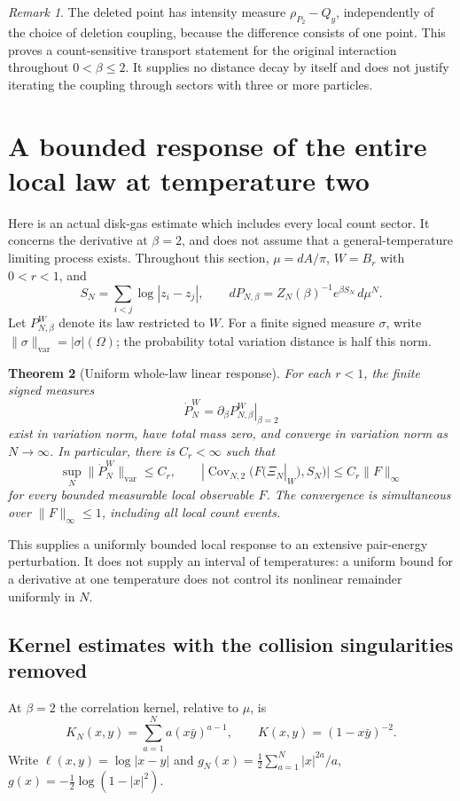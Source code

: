 \documentclass[11pt]{article}
\newtheorem{theorem}{Theorem}[section]
\theoremstyle{remark}\newtheorem{remark}[theorem]{Remark}
\begin{document}
\begin{remark}
The deleted point has intensity measure $\rho_{P_2}-Q_y$, independently
of the choice of deletion coupling, because the difference consists
of one point.  This proves a count-sensitive transport statement for
the original interaction throughout $0<\beta\le2$.  It supplies no
distance decay by itself and does not justify iterating the coupling
through sectors with three or more particles.
\end{remark}


\section{A bounded response of the entire local law at temperature two}
\label{sec:whole-local-linear-response}

Here is an actual disk-gas estimate which includes every local count sector.
It concerns the derivative at $\beta=2$, and does not assume that a
general-temperature limiting process exists. Throughout this section,
$\mu=dA/\pi$, $W=B_r$ with $0<r<1$, and
\[
 S_N=\sum_{i<j}\log|z_i-z_j|,
 \qquad dP_{N,\beta}=Z_N(\beta)^{-1}e^{\beta S_N}\,d\mu^N.
\]
Let $P_{N,\beta}^W$ denote its law restricted to $W$. For a finite signed
measure $\sigma$, write $\|\sigma\|_{\mathrm{var}}=|\sigma|(\Omega)$;
the probability total variation distance is half this norm.

\begin{theorem}[Uniform whole-law linear response]
\label{thm:whole-law-linear-response}
For each $r<1$, the finite signed measures
\[
 \dot P_N^W=\left.\partial_\beta P_{N,\beta}^W\right|_{\beta=2}
\]
exist in variation norm, have total mass zero, and converge in variation
norm as $N\to\infty$. In particular, there is $C_r<\infty$ such that
\[
 \sup_N\|\dot P_N^W\|_{\mathrm{var}}\le C_r,
 \qquad
 |\operatorname{Cov}_{N,2}(F(\Xi_N|_W),S_N)|
       \le C_r\|F\|_\infty
\]
for every bounded measurable local observable $F$. The convergence is
simultaneous over $\|F\|_\infty\le1$, including all local count events.
\end{theorem}

This supplies a uniformly bounded local response to an extensive pair-energy
perturbation. It does not supply an interval of temperatures: a uniform
bound for a derivative at one temperature does not control its nonlinear
remainder uniformly in $N$.

\subsection{Kernel estimates with the collision singularities removed}
At $\beta=2$ the correlation kernel, relative to $\mu$, is
\[
 K_N(x,y)=\sum_{a=1}^N a(x\bar y)^{a-1},\qquad
 K(x,y)=(1-x\bar y)^{-2}.
\]
Write $\ell(x,y)=\log|x-y|$ and
$g_N(x)=\frac12\sum_{a=1}^N|x|^{2a}/a$,
$g(x)=-\frac12\log(1-|x|^2)$.
\end{document}
